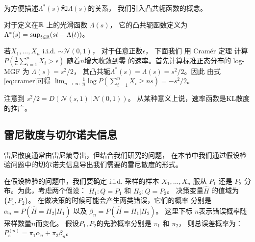 为方便描述$\Lambda^*(s)$和$\Lambda(s)$的关系，
我们引入凸共轭函数的概念。
\begin{definition}\label{def:convex_conjugate}
  对于定义在$\mathbb{R}$ 上的光滑函数 $\Lambda(s)$，
  它的凸共轭函数定义为
  $\Lambda^*(s) = \sup_{t \in \mathbb{R}} (st-\Lambda(t))$。
\end{definition}

\begin{example}\label{ex:cramer_ldp}
  若$X_1, \dots, X_n$ i.i.d. $\sim \mathcal{N}(0,1)$，
  对于任意正数$\epsilon$，
  下面我们 用  Cramér 定理 计算 $P(\frac{1}{n} \sum_{i=1}^n X_i > \epsilon)$ 
  随着$n$增大收敛到零
  的速率。首先计算标准正态分布的 log-MGF 为 $\Lambda(s)=s^2/2$，
  其凸共轭$\Lambda^*(s)=\Lambda(s)=s^2/2$。因此
  由式\eqref{eq:cramer}可得
  $\lim_{n\to \infty} \frac{1}{n}\log P( \sum_{i=1}^n X_i \geq  ns) =-s^2/2$。
  \end{example}
\begin{remark}
  注意到 $s^2/2=D(\mathcal{N}(s, 1) || \mathcal{N}(0,1))$。
  从某种意义上说，速率函数是KL散度的推广。
\end{remark}
\subsection{雷尼散度与切尔诺夫信息}
雷尼散度\cite{renyi1961measures}通常由雷尼熵导出，但结合我们研究的问题，
在本节中我们通过假设检验问题中的切尔诺夫信息导出我们需要的雷尼散度的形式。

在假设检验的问题中，我们要确定 i.i.d. 采样的样本
$X_1, \dots, X_n$ 服从
$P_1$ 还是 $P_2$ 分布。为此，考虑两个假设：
$H_1: Q=P_1$ 和 $H_2: Q=P_2$。
决策变量$\widehat{H}$ 的值域为 $\{P_1, P_2\}$。
在做决策的时候可能会产生两类错误，它们的概率
分别是 $\alpha_n=P(\widehat{H}=H_2|H_1)$
以及 $\beta_n=P(\widehat{H}=H_1|H_2)$。
这里下标 $n$表示错误概率随采样数量$n$而变化。
假设$P_1, P_2$的先验概率分别是 $\pi_1$ 和 $\pi_2$，
则总误差概率为：$P_e^{(n)} = \pi_1 \alpha_n
+ \pi_2 \beta_n$。

